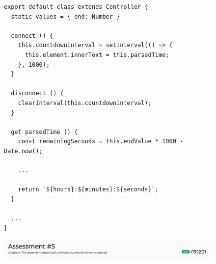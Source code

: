 \begin{figure}[H]
\begin{codebox}
\begin{verbatim}
export default class extends Controller {
  static values = { end: Number }

  connect () {
    this.countdownInterval = setInterval(() => {
      this.element.innerText = this.parsedTime;
    }, 1000);
  }

  disconnect () {
    clearInterval(this.countdownInterval);
  }

  get parsedTime () {
    const remainingSeconds = this.endValue * 1000 - Date.now();
    
    ...
    
    return `${hours}:${minutes}:${seconds}`;
  }

  ...
}
\end{verbatim}
\end{codebox}
\end{figure}

\begin{figure}[H]
  \centering
  \includegraphics[width=\textwidth]{images/countdown.png}
\end{figure}
